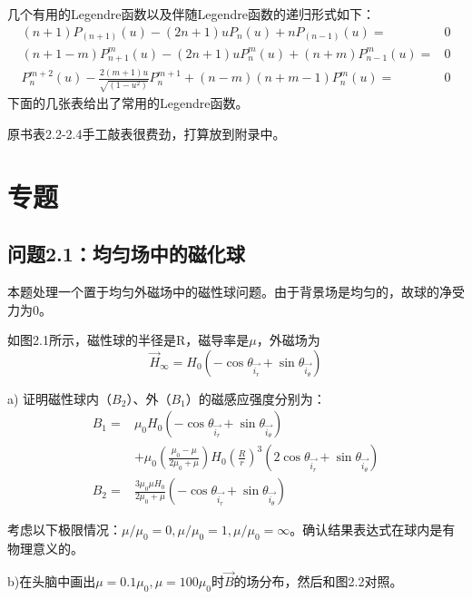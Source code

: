 几个有用的Legendre函数以及伴随Legendre函数的递归形式如下：
\begin{subequations}\label{eqn:legendre function2}
	\begin{align}
(n+1)P_(n+1)(u)-(2n+1)uP_n(u)+nP_(n-1)(u)=&0  \\
(n+1-m)P^m_{n+1}(u)-(2n+1)uP^m_n(u)+(n+m)P^m_{n-1}(u)=&0  \\
P_n^{m+2}(u)-\frac{2(m+1)u}{\sqrt{(1-u^2)}}P_n^{m+1}+(n-m)(n+m-1)P_n^m(u)=&0
  	\end{align}
\end{subequations}
下面的几张表给出了常用的Legendre函数。

\textcolor[rgb]{1.00,0.00,0.00}{原书表2.2-2.4手工敲表很费劲，打算放到附录中。}

\section{专题}
\subsection{问题2.1：均匀场中的磁化球}
本题处理一个置于均匀外磁场中的磁性球问题。由于背景场是均匀的，故球的净受力为0。

如图2.1所示，磁性球的半径是R，磁导率是$\mu$，外磁场为
\begin{equation}\label{eqn:2.40}
  \vec{H}_\infty = H_0 (-\cos \theta_{\vec{i_r}}+\sin\theta_{\vec{i_\theta}})
\end{equation}

a) 证明磁性球内（$B_2$）、外（$B_1$）的磁感应强度分别为：
\begin{eqnarray}
  B_1 =& \mu_0 H_0 (-\cos\theta_{\vec{i_r}}+\sin\theta_{\vec{i_\theta}})\\ \nonumber
          &+\mu_0 \left(\frac{\mu_0-\mu}{2\mu_0+\mu}\right)H_0 \left(\frac{R}{r}\right)^3 (2\cos\theta_{\vec{i_r}}+\sin\theta_{\vec{i_\theta}})\\ \nonumber
  B_2=& \frac{3\mu_0\mu H_0}{2\mu_0+\mu} (-\cos\theta_{\vec{i_r}}+\sin\theta_{\vec{i_\theta}})
\end{eqnarray}

考虑以下极限情况：$\mu/\mu_0=0, \mu/\mu_0=1,\mu/\mu_0=\infty$。确认结果表达式在球内是有物理意义的。

b)在头脑中画出$\mu=0.1\mu_0, \mu=100\mu_0$时$\vec{B}$的场分布，然后和图2.2对照。

